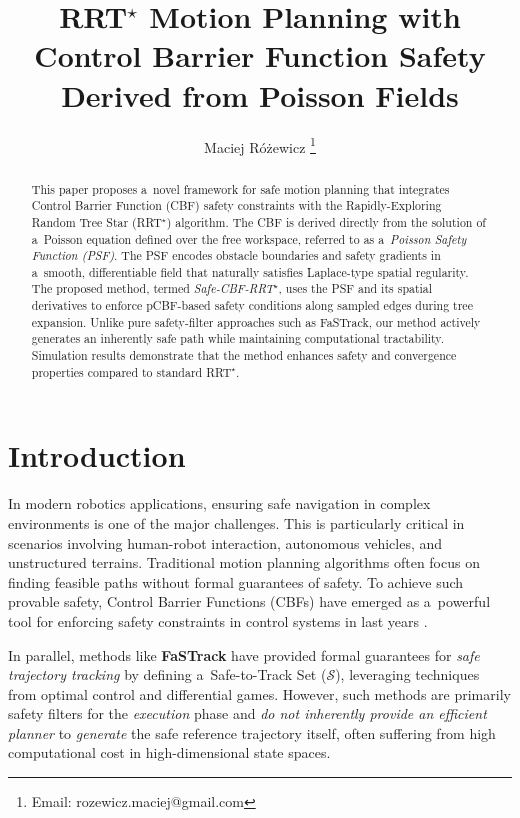 \documentclass[letterpaper, 10 pt, conference]{ieeeconf}
\title{RRT$^\star$ Motion Planning with Control Barrier Function Safety Derived from Poisson Fields}
\author{Maciej Różewicz
    \thanks{Email: rozewicz.maciej@gmail.com}
}
\begin{document}
\maketitle
\thispagestyle{empty}
\pagestyle{empty}

\begin{abstract}
This paper proposes a~novel framework for safe motion planning that integrates
Control Barrier Function (CBF) safety constraints with the Rapidly-Exploring
Random Tree Star (RRT$^\star$) algorithm. The CBF is derived directly from the solution
of a~Poisson equation defined over the free workspace, referred to as
a~\emph{Poisson Safety Function (PSF)}. The PSF encodes obstacle boundaries
and safety gradients in a~smooth, differentiable field that naturally satisfies
Laplace-type spatial regularity. The proposed method, termed
\emph{Safe-CBF-RRT$^\star$}, uses the PSF and its spatial derivatives to enforce
pCBF-based safety conditions along sampled edges during tree expansion. Unlike
pure safety-filter approaches such as FaSTrack, our method actively generates an
inherently safe path while maintaining computational tractability.
Simulation results demonstrate that the method enhances safety and convergence
properties compared to standard RRT$^\star$.
\end{abstract}

\section{Introduction}
In modern robotics applications, ensuring safe navigation in complex
environments is one of the major challenges. This is particularly critical in
scenarios involving human-robot interaction, autonomous vehicles, and
unstructured terrains. Traditional motion planning algorithms often focus on
finding feasible paths without formal guarantees of safety. To achieve such
provable safety, Control Barrier Functions (CBFs) have emerged as a~powerful
tool for enforcing safety constraints in control systems in last years \cite{8796030}. 

In parallel, methods like \textbf{FaSTrack} \cite{Chen_2021} have
provided formal guarantees for \textit{safe trajectory tracking} by defining
a~Safe-to-Track Set ($\mathcal{S}$), leveraging techniques from optimal control
and differential games. However, such methods are primarily safety filters for
the \textit{execution} phase and \textit{do not inherently provide an efficient planner} to
\textit{generate} the safe reference trajectory itself, often suffering from high
computational cost in high-dimensional state spaces.
\end{document}
